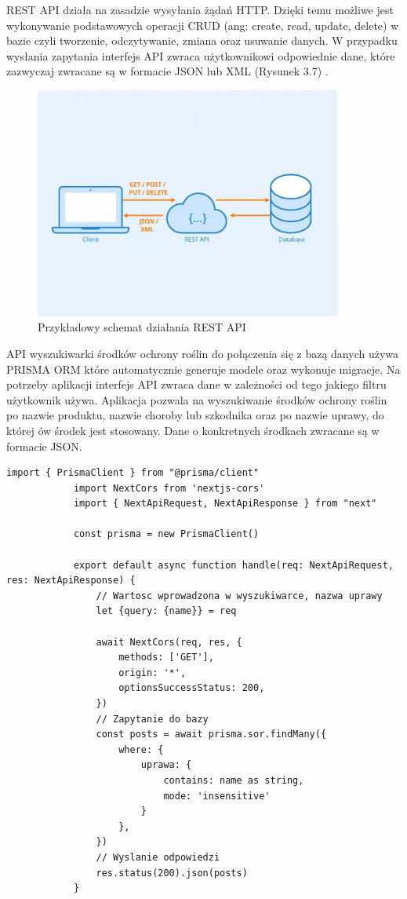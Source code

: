 \documentclass[a4paper,12pt,oneside]{book}
\begin{document}
		\newpage
		
		REST API działa na zasadzie wysyłania żądań HTTP. Dzięki temu możliwe jest wykonywanie podstawowych operacji CRUD (ang: create, read, update, delete) w bazie czyli tworzenie, odczytywanie, zmiana oraz usuwanie danych. W przypadku wysłania zapytania interfejs API zwraca użytkownikowi odpowiednie dane, które zazwyczaj zwracane są w formacie JSON lub XML (Rysunek 3.7) \cite{ref14}.
	
		\begin{figure}[H]
			\centering
			\includegraphics[width=0.9\textwidth]{grafika/restapi.png}
			\caption{Przykładowy schemat działania REST API}
		\end{figure}
	
		API wyszukiwarki środków ochrony roślin do połączenia się z bazą danych używa PRISMA ORM które automatycznie generuje modele oraz wykonuje migracje. Na potrzeby aplikacji interfejs API zwraca dane w zależności od tego jakiego filtru użytkownik używa. Aplikacja pozwala na wyszukiwanie środków ochrony roślin po nazwie produktu, nazwie choroby lub szkodnika oraz po nazwie uprawy, do której ów środek jest stosowany. Dane o konkretnych środkach zwracane są w formacie JSON.
		
		\newpage
		
		\begin{lstlisting}[caption=Kod API filtru wyszukiwania po nazwie uprawy]
			import { PrismaClient } from "@prisma/client"
			import NextCors from 'nextjs-cors'
			import { NextApiRequest, NextApiResponse } from "next"
			
			const prisma = new PrismaClient()
			
			export default async function handle(req: NextApiRequest, res: NextApiResponse) {
				// Wartosc wprowadzona w wyszukiwarce, nazwa uprawy 
				let {query: {name}} = req
				
				await NextCors(req, res, {
					methods: ['GET'],
					origin: '*',
					optionsSuccessStatus: 200,
				})
				// Zapytanie do bazy
				const posts = await prisma.sor.findMany({
					where: {
						uprawa: {
							contains: name as string,
							mode: 'insensitive'
						}
					},
				})
				// Wyslanie odpowiedzi
				res.status(200).json(posts)
			}
		\end{lstlisting}
	
\end{document}
